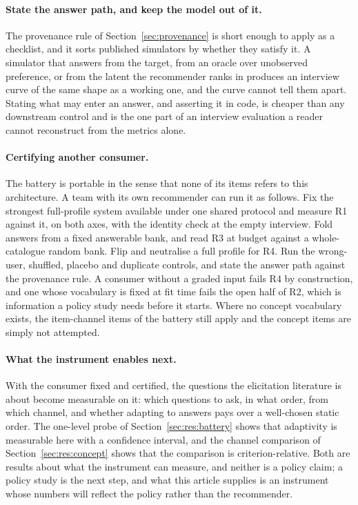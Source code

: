 \documentclass[manuscript,screen,review]{acmart}
\begin{document}
\paragraph{State the answer path, and keep the model out of it.} The provenance rule of Section~\ref{sec:provenance} is short enough to apply as a checklist, and it sorts published simulators by whether they satisfy it. A simulator that answers from the target, from an oracle over unobserved preference, or from the latent the recommender ranks in produces an interview curve of the same shape as a working one, and the curve cannot tell them apart. Stating what may enter an answer, and asserting it in code, is cheaper than any downstream control and is the one part of an interview evaluation a reader cannot reconstruct from the metrics alone.

\paragraph{Certifying another consumer.} The battery is portable in the sense that none of its items refers to this architecture. A team with its own recommender can run it as follows. Fix the strongest full-profile system available under one shared protocol and measure R1 against it, on both axes, with the identity check at the empty interview. Fold answers from a fixed answerable bank, and read R3 at budget against a whole-catalogue random bank. Flip and neutralise a full profile for R4. Run the wrong-user, shuffled, placebo and duplicate controls, and state the answer path against the provenance rule. A consumer without a graded input fails R4 by construction, and one whose vocabulary is fixed at fit time fails the open half of R2, which is information a policy study needs before it starts. Where no concept vocabulary exists, the item-channel items of the battery still apply and the concept items are simply not attempted.

\paragraph{What the instrument enables next.} With the consumer fixed and certified, the questions the elicitation literature is about become measurable on it: which questions to ask, in what order, from which channel, and whether adapting to answers pays over a well-chosen static order. The one-level probe of Section~\ref{sec:res:battery} shows that adaptivity is measurable here with a confidence interval, and the channel comparison of Section~\ref{sec:res:concept} shows that the comparison is criterion-relative. Both are results about what the instrument can measure, and neither is a policy claim; a policy study is the next step, and what this article supplies is an instrument whose numbers will reflect the policy rather than the recommender.
\end{document}
